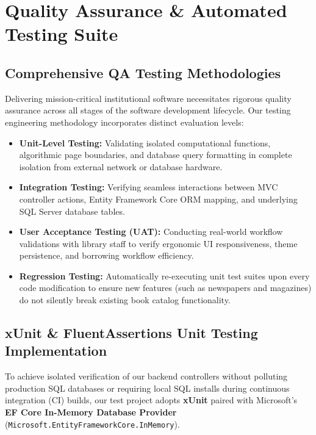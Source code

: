 \documentclass[11pt,a4paper]{report}
\begin{document}
\newpage

\chapter{Quality Assurance \& Automated Testing Suite}

\section{Comprehensive QA Testing Methodologies}
Delivering mission-critical institutional software necessitates rigorous quality assurance across all stages of the software development lifecycle. Our testing engineering methodology incorporates distinct evaluation levels:
\begin{itemize}[leftmargin=1.5em]
    \item \textbf{Unit-Level Testing:} Validating isolated computational functions, algorithmic page boundaries, and database query formatting in complete isolation from external network or database hardware.
    \item \textbf{Integration Testing:} Verifying seamless interactions between MVC controller actions, Entity Framework Core ORM mapping, and underlying SQL Server database tables.
    \item \textbf{User Acceptance Testing (UAT):} Conducting real-world workflow validations with library staff to verify ergonomic UI responsiveness, theme persistence, and borrowing workflow efficiency.
    \item \textbf{Regression Testing:} Automatically re-executing unit test suites upon every code modification to ensure new features (such as newspapers and magazines) do not silently break existing book catalog functionality.
\end{itemize}

\section{xUnit \& FluentAssertions Unit Testing Implementation}
To achieve isolated verification of our backend controllers without polluting production SQL databases or requiring local SQL installs during continuous integration (CI) builds, our test project adopts \textbf{xUnit} paired with Microsoft's \textbf{EF Core In-Memory Database Provider} (\texttt{Microsoft.EntityFrameworkCore.InMemory}).
\end{document}
